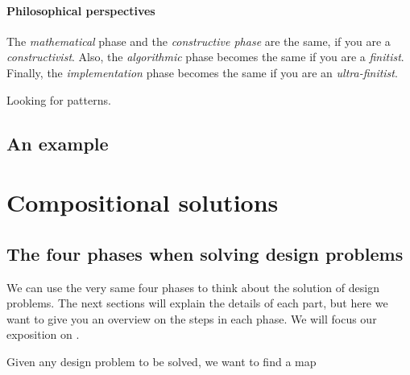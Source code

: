 \paragraph*{Philosophical perspectives}
The \emph{mathematical} phase and the \emph{constructive phase} are the same, if you are a \emph{constructivist}.
Also, the \emph{algorithmic} phase becomes the same if you are a \emph{finitist}.
Finally, the \emph{implementation} phase becomes the same if you are an \emph{ultra-finitist}.

\devel{
    }

Looking for patterns.

\devel{
    


    }

\subsection{An example}

\publictodomessage


\section{Compositional solutions}

\publictodomessage

\subsection{The four phases when solving design problems}
We can use the very same four phases to think about the solution of design problems.
The next sections will explain the details of each part, but here we want to give you an overview on the steps in each phase.
We will focus our exposition on \FixFunMinRes.

Given any design problem to be solved, we want to find a map

